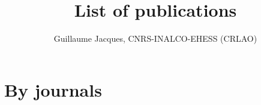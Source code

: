 \documentclass[oneside,a4paper,11pt]{article}
\newcommand{\langue}[2]{#1}
\begin{document}
  \title{\langue{List of publications}{Liste de publications}}
 
\author{Guillaume Jacques, CNRS-INALCO-EHESS (CRLAO)}
\maketitle
\sloppy
 
 \tableofcontents
  
 \section{\langue{By journals}{Articles classés par revue}}
\end{document}
